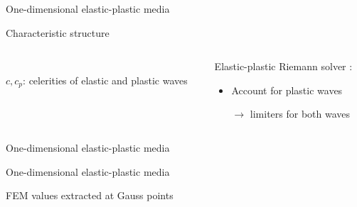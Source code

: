 \begin{frame}{One-dimensional elastic-plastic media}
\begin{block}{\footnotesize Characteristic structure \cite{Wang}}
\begin{columns}
\begin{column}{0.49\textwidth}
\begin{tikzpicture}[scale=0.6]
        \end{tikzpicture}\\
        \footnotesize $c,c_p$: celerities of elastic and plastic waves
      \end{column}
      \begin{column}{0.49\textwidth}
        \begin{block}{}
          \vspace{-0.95cm}
          \footnotesize Elastic-plastic Riemann solver \cite{Fogarty}:
          \begin{footnotesize}
            \begin{itemize}
            \item Account for \alert{plastic waves} 
            \item[$\rightarrow$] limiters for both waves
            \end{itemize}
          \end{footnotesize}
        \end{block}
      \end{column}
    \end{columns}
  \end{block}
  \vspace{-0.2cm}
\end{frame}

\begin{frame}{One-dimensional elastic-plastic media \cite{Thomas_EP}}
  \centering
\end{frame}


\begin{frame}{}
  \begin{block}{One-dimensional elastic-plastic media \cite{Thomas_EP}}
  \end{block}
  \begin{overprint}
    \centering
    
    FEM values extracted at Gauss points
    \centering
    
    
    \centering
    
      
  \end{overprint}
  \vspace{-0.1cm}
\end{frame}



